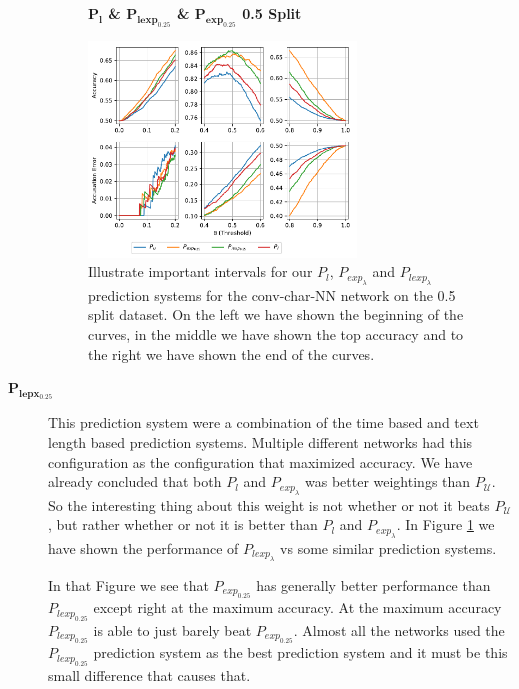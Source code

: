 \begin{description}
        \begin{figure}
            \centering
            \textbf{$\mathbf{P_l}$ \& $\mathbf{P_{lexp_{0.25}}}$ \&
            $\mathbf{P_{exp_{0.25}}}$ 0.5 Split}\par\medskip
            \includegraphics[width=0.7\textwidth]{./pictures/discussion/conv_char_nn_prediction_zoom_length}
            \caption{Illustrate important intervals for our $P_l$,
                $P_{exp_\lambda}$ and $P_{lexp_{\lambda}}$ prediction systems
                for the \gls{conv-char-NN} network on the 0.5 split dataset. On
                the left we have shown the beginning of the curves, in the
                middle we have shown the top accuracy and to the right we have
                shown the end of the curves.}
            \label{fig:conv_char_prediction_zoom_50_text_length}
        \end{figure}

    \item[$\mathbf{P_{lepx_{0.25}}}$]

        This prediction system were a combination of the time based and text
        length based prediction systems. Multiple different networks had this
        configuration as the configuration that maximized accuracy. We have
        already concluded that both $P_l$ and $P_{exp_\lambda}$ was better
        weightings than $P_\mathcal{U}$. So the interesting thing about this
        weight is not whether or not it beats $P_\mathcal{U}$, but rather
        whether or not it is better than $P_l$ and $P_{exp_\lambda}$. In Figure
        \ref{fig:conv_char_prediction_zoom_50_text_length} we have shown the
        performance of $P_{lexp_\lambda}$ vs some similar prediction systems.

        In that Figure we see that $P_{exp_{0.25}}$ has generally better
        performance than $P_{lexp_{0.25}}$ except right at the maximum accuracy.
        At the maximum accuracy $P_{lexp_{0.25}}$ is able to just barely beat
        $P_{exp_{0.25}}$. Almost all the networks used the $P_{lexp_{0.25}}$
        prediction system as the best prediction system and it must be this
        small difference that causes that.


\end{description}
